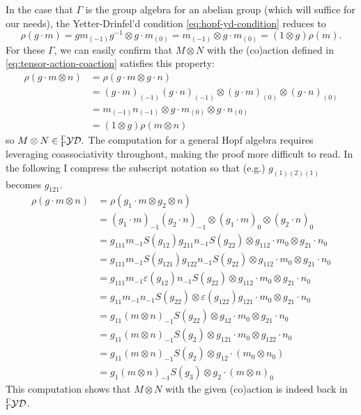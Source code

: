 \documentclass[12pt]{article}
\begin{document}
In the case that $\Gamma$ is the group algebra for an abelian group (which will suffice for our needs), the Yetter-Drinfel'd condition \eqref{eq:hopf-yd-condition} reduces to
\[\rho(g\cdot m)=gm_{(-1)}g^{-1}\otimes g\cdot m_{(0)}=m_{(-1)}\otimes g\cdot m_{(0)}=(1\otimes g)\rho(m).\]
For these $\Gamma$, we can easily confirm that $M\otimes N$ with the (co)action defined in \eqref{eq:tensor-action-coaction} satisfies this property:
\begin{align*}
    \rho(g\cdot m\otimes n)&= \rho(g\cdot m\otimes g\cdot n)\\
    &= (g\cdot m)_{(-1)}(g\cdot n)_{(-1)}\otimes (g\cdot m)_{(0)}\otimes (g\cdot n)_{(0)}\\
    &= m_{(-1)}n_{(-1)}\otimes g\cdot m_{(0)}\otimes g\cdot n_{(0)}\\
    &= (1\otimes g)\rho(m\otimes n)
\end{align*}
so $M\otimes N\in{^\Gamma_\Gamma\mathcal{YD}}.$ The computation for a general Hopf algebra requires leveraging coassociativity throughout, making the proof more difficult to read. In the following I compress the subscript notation so that (e.g.) $g_{(1)(2)(1)}$ becomes $g_{121}.$
\begin{align*}
    \rho(g\cdot m\otimes n)&=\rho(g_1\cdot m\otimes g_2\otimes n)\\
    &=(g_1\cdot m)_{-1}(g_2\cdot n)_{-1}\otimes (g_1\cdot m)_0\otimes (g_2\cdot n)_0\\
    &=g_{111}m_{-1}S(g_{12})g_{211}n_{-1}S(g_{22})\otimes g_{112}\cdot m_0\otimes g_{21}\cdot n_0\\
    &= g_{111}m_{-1}S(g_{121})g_{122}n_{-1}S(g_{22})\otimes g_{112}\cdot m_0\otimes g_{21}\cdot n_0\\
    &=g_{111}m_{-1}\varepsilon(g_{12})n_{-1}S(g_{22})\otimes g_{112}\cdot m_0\otimes g_{21}\cdot n_0\\
    &=g_{11}m_{-1}n_{-1}S(g_{22})\otimes \varepsilon(g_{122})g_{121}\cdot m_0\otimes g_{21}\cdot n_0\\
    &=g_{11}(m\otimes n)_{-1}S(g_{22})\otimes g_{12}\cdot m_0\otimes g_{21}\cdot n_0\\
    &=g_{11}(m\otimes n)_{-1}S(g_{2})\otimes g_{121}\cdot m_0\otimes g_{122}\cdot n_0\\
    &=g_{11}(m\otimes n)_{-1}S(g_{2})\otimes g_{12}\cdot (m_0\otimes n_0)\\
    &=g_1(m\otimes n)_{-1}S(g_3)\otimes g_2\cdot(m\otimes n)_0
\end{align*}
This computation shows that $M\otimes N$ with the given (co)action is indeed back in ${^\Gamma_\Gamma\mathcal{YD}}$.
\end{document}
